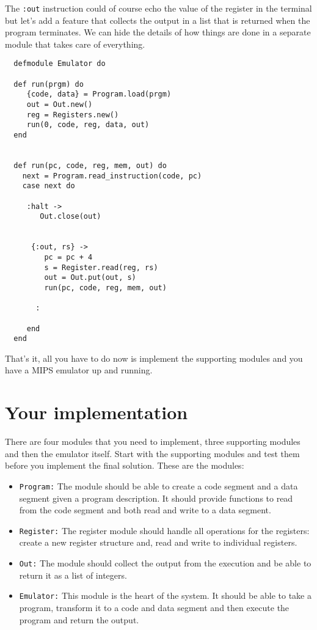 \documentclass[a4paper,11pt]{article}
\begin{document}
The {\tt :out} instruction could of course echo the value of the
register in the terminal but let's add a feature that collects the
output in a list that is returned when the program terminates. We can
hide the details of how things are done in a separate module that
takes care of everything.


\begin{verbatim}
  defmodule Emulator do

  def run(prgm) do
     {code, data} = Program.load(prgm)
     out = Out.new()
     reg = Registers.new() 
     run(0, code, reg, data, out)
  end


  def run(pc, code, reg, mem, out) do
    next = Program.read_instruction(code, pc)
    case next do
 
     :halt ->
        Out.close(out)
    

      {:out, rs} ->
         pc = pc + 4
         s = Register.read(reg, rs)
         out = Out.put(out, s)
         run(pc, code, reg, mem, out)          

       :

     end
  end
\end{verbatim}

 That's it, all you have to do now is implement the supporting modules and you have a MIPS emulator up and running.

 \section{Your implementation}

 There are four modules that you need to implement, three supporting
 modules and then the emulator itself. Start with the supporting
 modules and test them before you implement the final solution. These
 are the modules:

 \begin{itemize}
  \item{\tt Program:} The module should be able to create a code
   segment and a data segment given a program description. It should
   provide functions to read from the code segment and both read and
   write to a data segment.

  \item{\tt Register:} The register module should handle all operations for
   the registers: create a new register structure and, read and write to
   individual registers.

 \item{\tt Out:} The module should collect the output from the
   execution and be able to return it as a list of integers. 

 \item{\tt Emulator:} This module is the heart of the system. It
   should be able to take a program, transform it to a code and data
   segment and then execute the program and return the output.
 \end{itemize}
\end{document}
